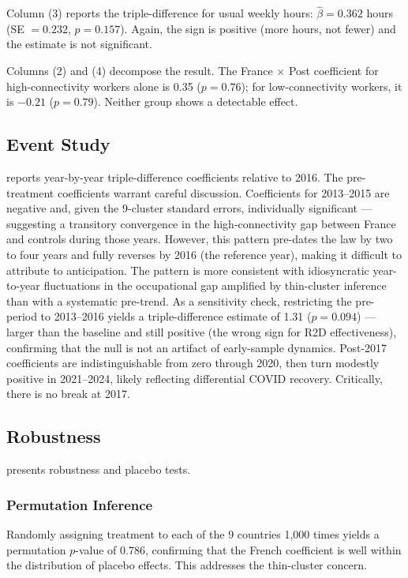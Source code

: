 \documentclass[12pt]{article}
\begin{document}
Column (3) reports the triple-difference for usual weekly hours: $\hat{\beta} = 0.362$ hours (SE $= 0.232$, $p = 0.157$). Again, the sign is positive (more hours, not fewer) and the estimate is not significant.

Columns (2) and (4) decompose the result. The France $\times$ Post coefficient for high-connectivity workers alone is 0.35 ($p = 0.76$); for low-connectivity workers, it is $-0.21$ ($p = 0.79$). Neither group shows a detectable effect.

\subsection{Event Study}



 reports year-by-year triple-difference coefficients relative to 2016. The pre-treatment coefficients warrant careful discussion. Coefficients for 2013--2015 are negative and, given the 9-cluster standard errors, individually significant --- suggesting a transitory convergence in the high-connectivity gap between France and controls during those years. However, this pattern pre-dates the law by two to four years and fully reverses by 2016 (the reference year), making it difficult to attribute to anticipation. The pattern is more consistent with idiosyncratic year-to-year fluctuations in the occupational gap amplified by thin-cluster inference than with a systematic pre-trend. As a sensitivity check, restricting the pre-period to 2013--2016 yields a triple-difference estimate of 1.31 ($p = 0.094$) --- larger than the baseline and still positive (the wrong sign for R2D effectiveness), confirming that the null is not an artifact of early-sample dynamics. Post-2017 coefficients are indistinguishable from zero through 2020, then turn modestly positive in 2021--2024, likely reflecting differential COVID recovery. Critically, there is no break at 2017.

\subsection{Robustness}



 presents robustness and placebo tests.

\subsubsection*{Permutation Inference} Randomly assigning treatment to each of the 9 countries 1,000 times yields a permutation $p$-value of 0.786, confirming that the French coefficient is well within the distribution of placebo effects. This addresses the thin-cluster concern.
\end{document}
